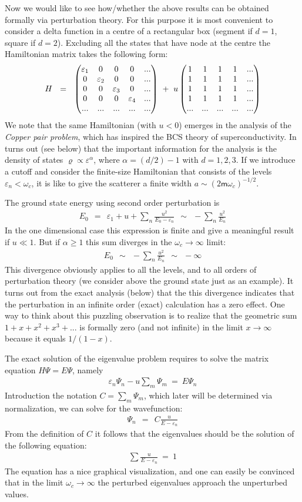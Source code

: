 \documentclass[onecolumn,fleqn]{revtex4}
\newcommand{\mass}{\mathsf{m}}
\newcommand{\amatrix}[1]{\begin{matrix} #1 \end{matrix}}
\newcommand{\beq}{\begin{eqnarray}}
\newcommand{\eeq}{\end{eqnarray}}
\begin{document}
Now we would like to see how/whether the above results 
can be obtained formally via perturbation theory. 
For this purpose it is most convenient 
to consider a delta function in a centre 
of a rectangular box (segment if $d=1$, square if $d=2$). 
Excluding all the states that have node at the centre 
the Hamiltonian matrix takes the following form:
\beq 
H \ \ = \ \ \left(\amatrix{
\varepsilon_1 & 0 & 0 & 0 & ... \cr
0 & \varepsilon_2 & 0 & 0 & ... \cr
0 & 0 & \varepsilon_3 & 0 & ... \cr
0 & 0 & 0 & \varepsilon_4 & ... \cr
... & ... & ... & ... & ... 
}\right)
\ + \ u\left(\amatrix{
1 & 1 & 1 & 1 & ... \cr
1 & 1 & 1 & 1 & ... \cr
1 & 1 & 1 & 1 & ... \cr
1 & 1 & 1 & 1 & ... \cr
... & ... & ... & ... & ... 
}\right)
\eeq
We note that the same Hamiltonian (with ${u<0}$) 
emerges in the analysis of the {\em Copper pair problem},  
which has inspired the BCS theory of superconductivity.  
In turns out (see below) that the important 
information for the analysis is the density 
of states ${\varrho \propto \varepsilon^{\alpha}}$, 
where $\alpha=(d/2){-}1$ with $d=1,2,3$. 
If we introduce a cutoff and consider the 
finite-size Hamiltonian that consists 
of the levels ${\varepsilon_n<\omega_c}$, it is like 
to give the scatterer a finite width ${a \sim (2\mass\omega_c)^{-1/2}}$.


The ground state energy  
using second order perturbation is 
\beq 
E_0 \ \ = \ \ \varepsilon_1 + u + \sum_n \frac{u^2}{E_0-\varepsilon_n} 
\ \ \sim \ \   - \sum_n \frac{u^2}{E_n}  
\eeq
In the one dimensional case this expression is finite 
and give a meaningful result if $u\ll1$. 
But if $\alpha\ge 1$ this sum diverges in the $\omega_c\rightarrow\infty$ limit:
\beq 
E_0  \ \ \sim \ \   -\sum_n \frac{u^2}{E_n}  \ \ \sim \ \  -\infty 
\eeq
This divergence obviously applies to all the levels, 
and to all orders of perturbation theory 
(we consider above the ground state just as an example).  
It turns out from the exact analysis  (below) 
that the this divergence indicates that the perturbation 
in an infinite order (exact) calculation has a zero effect. 
One way to think about this puzzling observation is to 
realize that the geometric sum ${1+x+x^2+x^3+...}$ 
is formally zero (and not infinite) in the limit $x\rightarrow\infty$ 
because it equals ${1/(1-x)}$.    


The exact solution of the eigenvalue problem requires 
to solve the matrix equation ${H\Psi=E\Psi}$, namely 
\beq 
\varepsilon_n \Psi_n -u\sum_m\Psi_m  \ = \ E\Psi_n
\eeq
Introduction the notation $C=\sum_m\Psi_m$, 
which later will be determined via normalization, 
we can solve for the wavefunction:  
\beq 
\Psi_n  \ \ = \ \ C\frac{u}{E-\varepsilon_n}
\eeq
From the definition of $C$ it follows 
that the eigenvalues should be the solution 
of the following equation: 
\beq 
\sum \frac{u}{E-\varepsilon_n} \ = \ 1
\eeq
The equation has a nice graphical visualization, 
and one can easily be convinced that in the 
limit $\omega_c\rightarrow\infty$ the perturbed eigenvalues   
approach the unperturbed values. 
\end{document}

